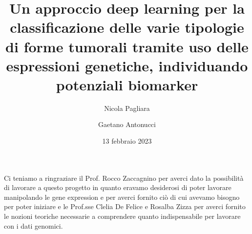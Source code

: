 \documentclass[manuscript, language=italian, language=english, authorversion=false, authordraft=false, screen=true,
noacm=true]{acmart}
\begin{document}
\fancyhead{}
\def\thetitle{Un approccio deep learning per la classificazione delle varie tipologie di forme tumorali tramite uso delle espressioni genetiche, individuando potenziali biomarker}
\title{\thetitle}

\author{Nicola Pagliara}
\author{Gaetano Antonucci}
\date{13 febbraio 2023}
\acmDOI{}
\acmPrice{}
\maketitle




\begin{acks}
Ci teniamo a ringraziare il Prof. Rocco Zaccagnino per averci dato la possibilità
di lavorare a questo progetto in quanto eravamo desiderosi di poter lavorare manipolando
le gene expression e per averci fornito ciò di cui avevamo bisogno per poter
iniziare e le Prof.sse Clelia De Felice e Rosalba Zizza per averci fornito le nozioni
teoriche necessarie a comprendere quanto indispensabile per lavorare con i dati genomici.
\end{acks}

\appendix

\end{document}
